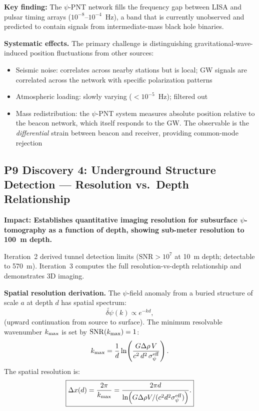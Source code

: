 \documentclass[aps,prd,twocolumn,superscriptaddress,nofootinbib]{revtex4-2}
\newcommand{\SNR}{\mathrm{SNR}}
\begin{document}
\textbf{Key finding:} The $\psi$-PNT network fills the frequency gap
between LISA and pulsar timing arrays ($10^{-8}$--$10^{-4}$~Hz),
a band that is currently unobserved and predicted to contain
signals from intermediate-mass black hole binaries.

\textbf{Systematic effects.}  The primary challenge is distinguishing
gravitational-wave-induced position fluctuations from other sources:
\begin{itemize}
\item Seismic noise: correlates across nearby stations but is local;
GW signals are correlated across the network with specific
polarization patterns
\item Atmospheric loading: slowly varying ($<10^{-5}$~Hz);
filtered out
\item Mass redistribution: the $\psi$-PNT system measures absolute
position relative to the beacon network, which itself responds to
the GW.  The observable is the \emph{differential} strain between
beacon and receiver, providing common-mode rejection
\end{itemize}

\subsection{P9 Discovery 4: Underground Structure Detection ---
Resolution vs.\ Depth Relationship}

\textbf{Impact: Establishes quantitative imaging resolution for
subsurface $\psi$-tomography as a function of depth, showing
sub-meter resolution to 100~m depth.}

Iteration~2 derived tunnel detection limits ($\SNR > 10^7$ at 10~m
depth; detectable to 570~m).  Iteration~3 computes the full
resolution-vs-depth relationship and demonstrates 3D imaging.

\textbf{Spatial resolution derivation.}
The $\psi$-field anomaly from a buried structure of scale $a$ at
depth $d$ has spatial spectrum:
\begin{equation}
\tilde{\delta\psi}(k) \propto e^{-kd},
\label{eq:upward-continuation}
\end{equation}
(upward continuation from source to surface).  The minimum
resolvable wavenumber $k_{\rm max}$ is set by $\SNR(k_{\rm max}) = 1$:
\begin{equation}
k_{\rm max} = \frac{1}{d}\ln\!\left(\frac{G\Delta\rho\,V}
{c^2\,d^2\,\sigma_\psi^{\rm eff}}\right).
\label{eq:kmax}
\end{equation}
The spatial resolution is:
\begin{equation}
\boxed{
\Delta x(d) = \frac{2\pi}{k_{\rm max}}
= \frac{2\pi d}{\ln(G\Delta\rho V/(c^2 d^2\sigma_\psi^{\rm eff}))}.
}
\label{eq:resolution-depth}
\end{equation}
\end{document}
